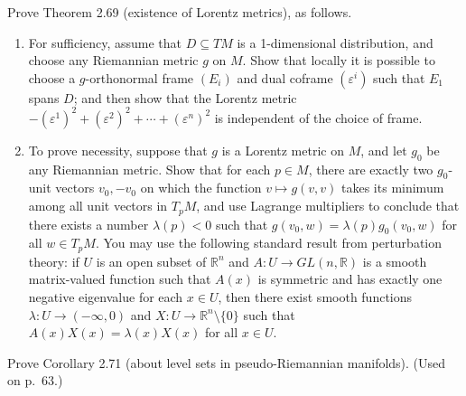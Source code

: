 \begin{exercise}\label{prob:lorentz-metric-existence}
\leanok
{}
Prove Theorem 2.69 (existence of Lorentz metrics), as follows.

\begin{enumerate}
\item[(a)] For sufficiency, assume that $D \subseteq TM$ is a 1-dimensional distribution, and choose any Riemannian metric $g$ on $M$. Show that locally it is possible to choose a $g$-orthonormal frame $(E_i)$ and dual coframe $(\varepsilon^i)$ such that $E_1$ spans $D$; and then show that the Lorentz metric $-(\varepsilon^1)^2 + (\varepsilon^2)^2 + \cdots + (\varepsilon^n)^2$ is independent of the choice of frame.

\item[(b)] To prove necessity, suppose that $g$ is a Lorentz metric on $M$, and let $g_0$ be any Riemannian metric. Show that for each $p \in M$, there are exactly two $g_0$-unit vectors $v_0, -v_0$ on which the function $v \mapsto g(v, v)$ takes its minimum among all unit vectors in $T_p M$, and use Lagrange multipliers to conclude that there exists a number $\lambda(p) < 0$ such that $g(v_0, w) = \lambda(p)g_0(v_0, w)$ for all $w \in T_p M$. You may use the following standard result from perturbation theory: if $U$ is an open subset of $\mathbb{R}^n$ and $A: U \to GL(n, \mathbb{R})$ is a smooth matrix-valued function such that $A(x)$ is symmetric and has exactly one negative eigenvalue for each $x \in U$, then there exist smooth functions $\lambda: U \to (-\infty, 0)$ and $X: U \to \mathbb{R}^n \setminus \{0\}$ such that $A(x)X(x) = \lambda(x)X(x)$ for all $x \in U$.
\end{enumerate}
\end{exercise}

\begin{exercise}\label{prob:level-sets-pseudo-riemannian}
\leanok
{}
Prove Corollary 2.71 (about level sets in pseudo-Riemannian manifolds). (Used on p.\ 63.)
\end{exercise}